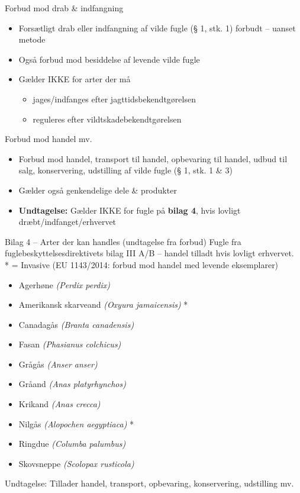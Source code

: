 \begin{frame}{Forbud mod drab \& indfangning}
\begin{itemize}
  \item Forsætligt drab eller indfangning af vilde fugle (§ 1, stk. 1) forbudt – uanset metode
  \item Også forbud mod besiddelse af levende vilde fugle
  \item Gælder IKKE for arter der må
  \begin{itemize}
    \item jages/indfanges efter jagttidsbekendtgørelsen
    \item reguleres efter vildtskadebekendtgørelsen
  \end{itemize}
\end{itemize}
\end{frame}

\begin{frame}{Forbud mod handel mv.}
\begin{itemize}
  \item Forbud mod handel, transport til handel, opbevaring til handel, udbud til salg, konservering, udstilling af vilde fugle (§ 1, stk. 1 \& 3)
  \item Gælder også genkendelige dele \& produkter
  \item \textbf{Undtagelse:} Gælder IKKE for fugle på \textbf{bilag 4}, hvis lovligt dræbt/indfanget/erhvervet
\end{itemize}
\end{frame}

\begin{frame}{Bilag 4 – Arter der kan handles (undtagelse fra forbud)}
\tiny
Fugle fra fuglebeskyttelsesdirektivets bilag III A/B – handel tilladt hvis lovligt erhvervet.\\
* = Invasive (EU 1143/2014: forbud mod handel med levende eksemplarer)

\begin{itemize}
  \item Agerhøne \textit{(Perdix perdix)}
  \item Amerikansk skarveand \textit{(Oxyura jamaicensis)} *
  \item Canadagås \textit{(Branta canadensis)}
  \item Fasan \textit{(Phasianus colchicus)}
  \item Grågås \textit{(Anser anser)}
  \item Gråand \textit{(Anas platyrhynchos)}
  \item Krikand \textit{(Anas crecca)}
  \item Nilgås \textit{(Alopochen aegyptiaca)} *
  \item Ringdue \textit{(Columba palumbus)}
  \item Skovsneppe \textit{(Scolopax rusticola)}
\end{itemize}

\tiny
Undtagelse: Tillader handel, transport, opbevaring, konservering, udstilling mv.
\end{frame}

